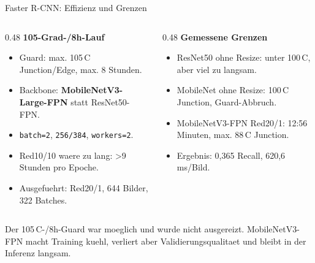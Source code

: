 \begin{frame}{Faster R-CNN: Effizienz und Grenzen}
\scriptsize
\begin{columns}[T,onlytextwidth]
\begin{column}{0.48\textwidth}
\textbf{105-Grad-/8h-Lauf}
\begin{itemize}\setlength\itemsep{0.08em}
    \item Guard: max. 105\,\textdegree C Junction/Edge, max. 8 Stunden.
    \item Backbone: \textbf{MobileNetV3-Large-FPN} statt ResNet50-FPN.
    \item \texttt{batch=2}, \texttt{256/384}, \texttt{workers=2}.
    \item Red10/10 waere zu lang: >9 Stunden pro Epoche.
    \item Ausgefuehrt: Red20/1, 644 Bilder, 322 Batches.
\end{itemize}
\end{column}
\begin{column}{0.48\textwidth}
\textbf{Gemessene Grenzen}
\begin{itemize}\setlength\itemsep{0.08em}
    \item ResNet50 ohne Resize: unter 100\,\textdegree C, aber viel zu langsam.
    \item MobileNet ohne Resize: 100\,\textdegree C Junction, Guard-Abbruch.
    \item MobileNetV3-FPN Red20/1: 12:56 Minuten, max. 88\,\textdegree C Junction.
    \item Ergebnis: 0,365 Recall, 620,6 ms/Bild.
\end{itemize}
\end{column}
\end{columns}
\vspace{0.15em}
\begin{mynote}[Einordnung]
\tiny
Der 105\,\textdegree C-/8h-Guard war moeglich und wurde nicht ausgereizt. MobileNetV3-FPN macht Training kuehl, verliert aber Validierungsqualitaet und bleibt in der Inferenz langsam.
\end{mynote}
\end{frame}
